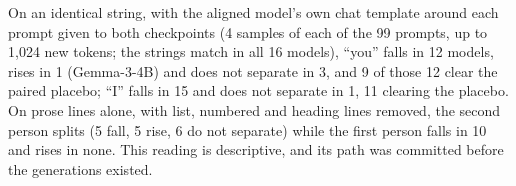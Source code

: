 On an identical string, with the aligned model's own chat template around each prompt given to both checkpoints (4 samples of each of the 99 prompts, up to 1{,}024 new tokens; the strings match in all 16 models), ``you'' falls in 12 models, rises in 1 (Gemma-3-4B) and does not separate in 3, and 9 of those 12 clear the paired placebo; ``I'' falls in 15 and does not separate in 1, 11 clearing the placebo. On prose lines alone, with list, numbered and heading lines removed, the second person splits (5 fall, 5 rise, 6 do not separate) while the first person falls in 10 and rises in none. This reading is descriptive, and its path was committed before the generations existed.
